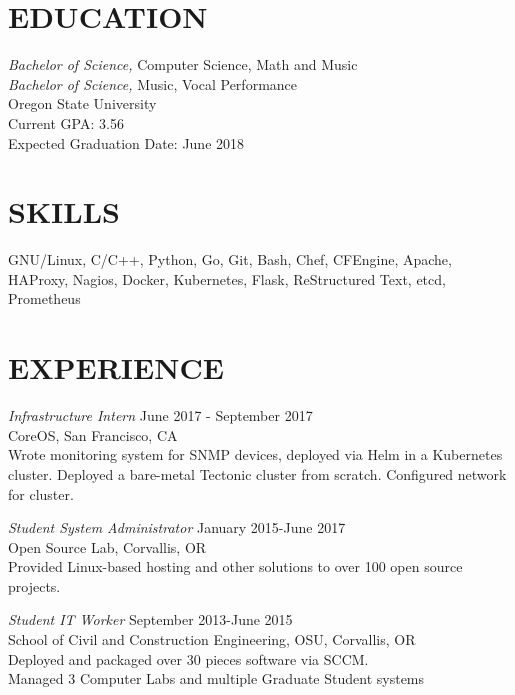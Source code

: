 \documentclass[line,margin]{res}
\begin{document}
\address{(503)-758-6952, fahlmantaylor@gmail.com}
\address{github.com/fahlmant, linkedin.com/in/taylorfahlman}
\begin{resume}


\section{EDUCATION}
                    {\sl Bachelor of Science,} Computer Science, Math and Music \\
                    {\sl Bachelor of Science,} Music, Vocal Performance \\
                    Oregon State University\\
                    Current GPA: 3.56\\
                    Expected Graduation Date: June 2018
                    
\section{SKILLS}
                    GNU/Linux, C/C++, Python, Go, Git, Bash, Chef, CFEngine, Apache, HAProxy, Nagios, Docker, Kubernetes,
                    Flask, ReStructured Text, etcd, Prometheus
\section{EXPERIENCE}
                    {\sl Infrastructure Intern} \hfill June 2017 - September 2017\\
                    CoreOS,
                    San Francisco, CA\\
                    Wrote monitoring system for SNMP devices, deployed via Helm in a Kubernetes cluster.
                    Deployed a bare-metal Tectonic cluster from scratch. Configured network for cluster.

                    {\sl Student System Administrator} \hfill January 2015-June 2017\\
                    Open Source Lab, 
                    Corvallis, OR\\
                    Provided Linux-based hosting and other solutions to over 100 open source projects.

                    {\sl Student IT Worker} \hfill September 2013-June 2015 \\
                    School of Civil and Construction Engineering, OSU, 
                    Corvallis, OR\\ 
                    Deployed and packaged over 30 pieces software via SCCM.\\
                    Managed 3 Computer Labs and multiple Graduate Student systems


\end{resume}
\end{document}
